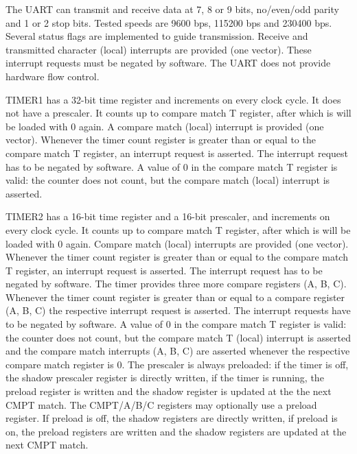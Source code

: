 \documentclass[12pt]{article}
\begin{document}
The UART can transmit and receive data at 7, 8 or 9 bits, no/even/odd parity and 1 or 2 stop bits. Tested speeds are 9600 bps, 115200 bps and 230400 bps. Several status flags are implemented to guide transmission. Receive and transmitted character (local) interrupts are provided (one vector). These interrupt requests must be negated by software. The UART does not provide hardware flow control.

TIMER1 has a 32-bit time register and increments on every clock cycle. It does not have a prescaler. It counts up to compare match T register, after which is will be loaded with 0 again. A compare match (local) interrupt is provided (one vector). Whenever the timer count register is greater than or equal to the compare match T register, an interrupt request is asserted. The interrupt request has to be negated by software. A value of 0 in the compare match T register is valid: the counter does not count, but the compare match (local) interrupt is asserted.

TIMER2 has a 16-bit time register and a 16-bit prescaler, and increments on every clock cycle. It counts up to compare match T register, after which is will be loaded with 0 again. Compare match (local) interrupts are provided (one vector). Whenever the timer count register is greater than or equal to the compare match T register, an interrupt request is asserted. The interrupt request has to be negated by software. The timer provides three more compare registers (A, B, C). Whenever the timer count register is greater than or equal to a compare register (A, B, C) the respective interrupt request is asserted. The interrupt requests have to be negated by software. A value of 0 in the compare match T register is valid: the counter does not count, but the compare match T (local) interrupt is asserted and the compare match interrupts (A, B, C) are asserted whenever the respective compare match register is 0. The prescaler is always preloaded: if the timer is off, the shadow prescaler register is directly written, if the timer is running, the preload register is written and the shadow register is updated at the the next CMPT match. The CMPT/A/B/C registers may optionally use a preload register. If preload is off, the shadow registers are directly written, if preload is on, the preload registers are written and the shadow registers are updated at the next CMPT match.
\end{document}
